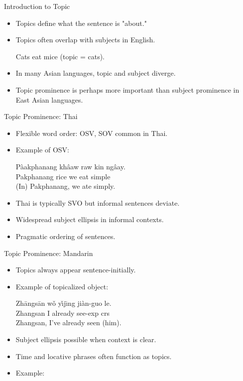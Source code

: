 \documentclass{beamer}
\begin{document}
\begin{frame}{Introduction to Topic}
  \begin{itemize}
    \item Topics define what the sentence is "about."
    \item Topics often overlap with subjects in English.
        \begin{exe}
      \ex
      Cats eat mice (topic = cats).
      \end{exe}
    \item In many Asian languages, topic and subject diverge.
    \item Topic prominence is perhaps more important than subject prominence in East Asian languages.
  \end{itemize}
\end{frame}

\begin{frame}{Topic Prominence: Thai}
  \begin{itemize}
    \item Flexible word order: OSV, SOV common in Thai.
    \item Example of OSV:
    \begin{exe}
\ex 
    \gll Pàakphanang khâaw raw kin ngâay. \\
         Pakphanang rice we eat simple \\
    \trans (In) Pakphanang, we ate simply.
    \end{exe}
    \item Thai is typically SVO but informal sentences deviate.
    \item Widespread subject ellipsis in informal contexts.
    \item Pragmatic ordering of sentences.
  \end{itemize}
\end{frame}

\begin{frame}{Topic Prominence: Mandarin}
  \begin{itemize}
    \item Topics always appear sentence-initially.
    \item Example of topicalized object:
    \begin{exe}
\ex 
    \gll Zhāngsān wǒ yı̌jı̄ng jiàn-guo le. \\
         Zhangsan I already see-exp crs \\
    \trans Zhangsan, I've already seen (him).
    \end{exe}
    \item Subject ellipsis possible when context is clear.
    \item Time and locative phrases often function as topics.
    \item Example: 
  \end{itemize}
\end{frame}
\end{document}
